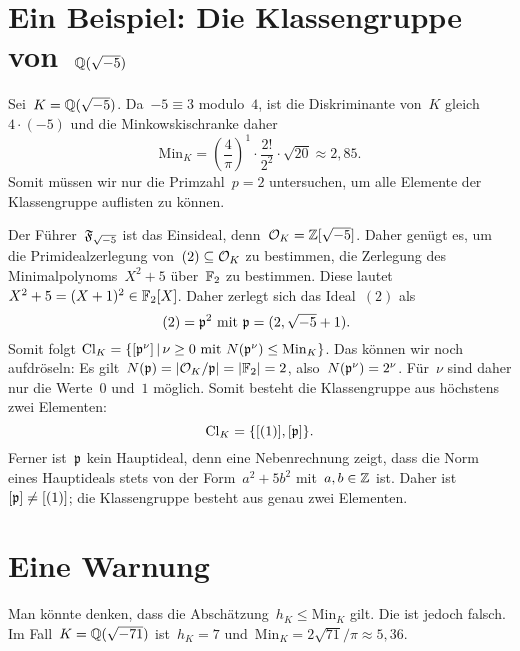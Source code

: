\documentclass{uebblatt}
\newcommand{\Cl}{\mathrm{Cl}}
\newcommand{\Min}{\mathrm{Min}}
\begin{document}
\newpage
\section*{Ein Beispiel: Die Klassengruppe von~$\mathbb{Q}(\sqrt{-5})$}

Sei~$K = \mathbb{Q}(\sqrt{-5})$. Da~$-5 \equiv 3$ modulo~$4$, ist die Diskriminante
von~$K$ gleich~$4 \cdot (-5)$ und die Minkowskischranke daher
\[ \Min_K = \left(\frac{4}{\pi}\right)^1 \cdot \frac{2!}{2^2} \cdot \sqrt{20}
  \approx 2{,}85. \]
Somit müssen wir nur die Primzahl~$p = 2$ untersuchen, um alle Elemente der
Klassengruppe auflisten zu können.

Der Führer~$\mathfrak{F}_{\sqrt{-5}}$ ist das Einsideal, denn~$\mathcal{O}_K = \mathbb{Z}[\sqrt{-5}]$.
Daher genügt es, um die Primidealzerlegung von~$(2) \subseteq \mathcal{O}_K$ zu
bestimmen, die Zerlegung des Minimalpolynoms~$X^2 + 5$ über~$\mathbb{F}_2$ zu
bestimmen. Diese lautet
$X^2 + 5 = (X + 1)^2 \in \mathbb{F}_2[X]$.
Daher zerlegt sich das Ideal~$(2)$ als
\[ \text{$(2) = \mathfrak{p}^2$ mit~$\mathfrak{p} = (2, \sqrt{-5} + 1)$. } \]
Somit folgt
$\Cl_K = \{ [\ppp^\nu] \,|\, \text{$\nu \geq 0$ mit~$N(\ppp^\nu) \leq
\Min_K$} \}$.
Das können wir noch aufdröseln: Es gilt~$N(\mathfrak{p}) = |\mathcal{O}_K/\mathfrak{p}| = |\mathbb{F}_2| = 2$,
also~$N(\mathfrak{p}^\nu) = 2^\nu$. Für~$\nu$ sind daher nur die Werte~$0$ und~$1$
möglich. Somit besteht die Klassengruppe aus höchstens zwei
Elementen:
\[ \Cl_K = \{ [(1)], [\ppp] \}. \]
Ferner ist~$\mathfrak{p}$ kein Hauptideal, denn eine Nebenrechnung zeigt, dass die Norm
eines Hauptideals stets von der Form~$a^2 + 5b^2$ mit~$a,b \in \mathbb{Z}$ ist. Daher
ist~$[\mathfrak{p}] \neq [(1)]$; die Klassengruppe besteht aus genau zwei Elementen.


\section*{Eine Warnung}

Man könnte denken, dass die Abschätzung~$h_K \leq \Min_K$ gilt. Die ist jedoch
falsch. Im Fall~$K = \mathbb{Q}(\sqrt{-71})$ ist~$h_K = 7$ und~$\Min_K =
2\sqrt{71}/\pi \approx 5{,}36$.
\end{document}
